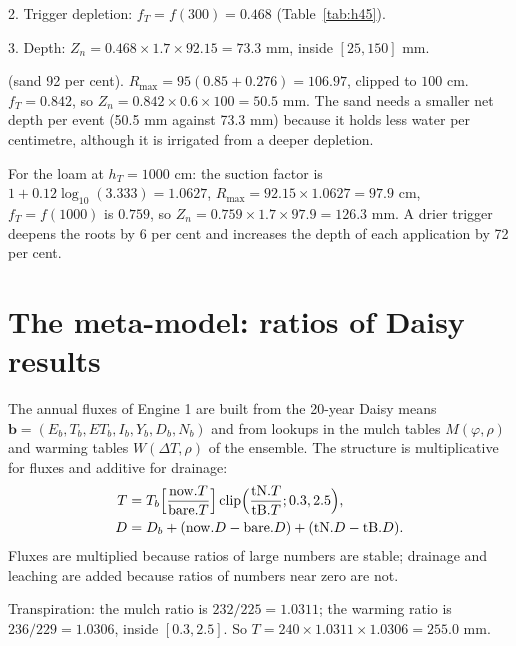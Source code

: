 2. Trigger depletion: $f_T=f(300)=0.468$ (Table~\ref{tab:h45}).

3. Depth: $Z_n=0.468\times1.7\times92.15=73.3$ mm, inside $[25,150]$ mm.

 (sand 92 per cent). $R_{\max}=95(0.85+0.276)=106.97$, clipped to $100$ cm. $f_T=0.842$, so $Z_n=0.842\times0.6\times100=50.5$ mm. The sand needs a smaller net depth per event (50.5 mm against 73.3 mm) because it holds less water per centimetre, although it is irrigated from a deeper depletion.

 For the loam at $h_T=1000$ cm: the suction factor is $1+0.12\log_{10}(3.333)=1.0627$, $R_{\max}=92.15\times1.0627=97.9$ cm, $f_T=f(1000)$ is $0.759$, so $Z_n=0.759\times1.7\times97.9=126.3$ mm. A drier trigger deepens the roots by 6 per cent and increases the depth of each application by 72 per cent.


\section{The meta-model: ratios of Daisy results}
The annual fluxes of Engine 1 are built from the 20-year Daisy means $\mathbf b=(E_b,T_b,ET_b,I_b,Y_b,D_b,N_b)$ and from lookups in the mulch tables $M(\varphi,\rho)$ and warming tables $W(\Delta T,\rho)$ of the ensemble. The structure is multiplicative for fluxes and additive for drainage:
\begin{align}
T&=T_b\Bigl[\frac{\mathrm{now}.T}{\mathrm{bare}.T}\Bigr]\,\mathrm{clip}\Bigl(\frac{\mathrm{tN}.T}{\mathrm{tB}.T};0.3,2.5\Bigr),\label{eq:mT}\\
D&=D_b+(\mathrm{now}.D-\mathrm{bare}.D)+(\mathrm{tN}.D-\mathrm{tB}.D).\label{eq:mD}
\end{align}
Fluxes are multiplied because ratios of large numbers are stable; drainage and leaching are added because ratios of numbers near zero are not.

\sol  Transpiration: the mulch ratio is $232/225=1.0311$; the warming ratio is $236/229=1.0306$, inside $[0.3,2.5]$. So $T=240\times1.0311\times1.0306=255.0$ mm.

